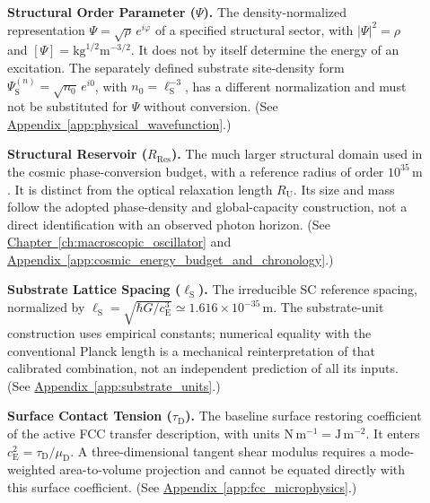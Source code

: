 \begin{description}
\item[] \begin{minipage}[t]{\linewidth}
\textbf{Structural Order Parameter ($\Psi$).} The density-normalized representation $\Psi=\sqrt{\rho}\,e^{i\varphi}$ of a specified structural sector, with $|\Psi|^2=\rho$ and $[\Psi]=\mathrm{kg}^{1/2}\mathrm m^{-3/2}$. It does not by itself determine the energy of an excitation. The separately defined substrate site-density form $\Psi_{\mathrm S}^{(n)}=\sqrt{n_0}\,e^{i0}$, with $n_0=\ell_{\mathrm S}^{-3}$, has a different normalization and must not be substituted for $\Psi$ without conversion.
(See \hyperref[app:physical_wavefunction]{Appendix~\ref*{app:physical_wavefunction}}.)
\end{minipage}

\item[] \begin{minipage}[t]{\linewidth}
\textbf{Structural Reservoir ($R_{\mathrm{Res}}$).} The much larger structural domain used in the cosmic phase-conversion budget, with a reference radius of order $10^{35}\,\mathrm m$. It is distinct from the optical relaxation length $R_{\mathrm U}$. Its size and mass follow the adopted phase-density and global-capacity construction, not a direct identification with an observed photon horizon.
(See \hyperref[ch:macroscopic_oscillator]{Chapter~\ref*{ch:macroscopic_oscillator}} and \hyperref[app:cosmic_energy_budget_and_chronology]{Appendix~\ref*{app:cosmic_energy_budget_and_chronology}}.)
\end{minipage}

\item[] \begin{minipage}[t]{\linewidth}
\textbf{Substrate Lattice Spacing ($\ell_{\mathrm S}$).} The irreducible SC reference spacing, normalized by $\ell_{\mathrm S}=\sqrt{\hbar G/c_{\mathrm E}^3}\simeq1.616\times10^{-35}\,\mathrm m$. The substrate-unit construction uses empirical constants; numerical equality with the conventional Planck length is a mechanical reinterpretation of that calibrated combination, not an independent prediction of all its inputs.
(See \hyperref[app:substrate_units]{Appendix~\ref*{app:substrate_units}}.)
\end{minipage}

\item[] \begin{minipage}[t]{\linewidth}
\textbf{Surface Contact Tension ($\tau_{\mathrm D}$).} The baseline surface restoring coefficient of the active FCC transfer description, with units $\mathrm{N\,m^{-1}}=\mathrm{J\,m^{-2}}$. It enters $c_{\mathrm E}^2=\tau_{\mathrm D}/\mu_{\mathrm D}$. A three-dimensional tangent shear modulus requires a mode-weighted area-to-volume projection and cannot be equated directly with this surface coefficient.
(See \hyperref[app:fcc_microphysics]{Appendix~\ref*{app:fcc_microphysics}}.)
\end{minipage}


\end{description}
